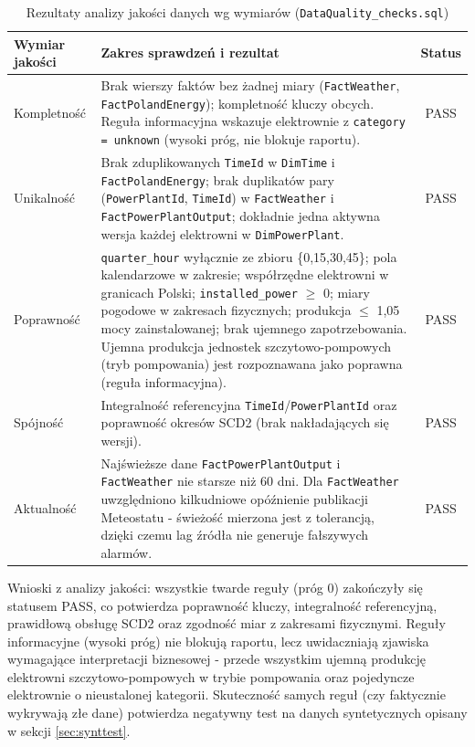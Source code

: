 \documentclass[12pt]{article}
\begin{document}
	\begin{table}[H]
		\centering
		\small
		\begin{tabularx}{\textwidth}{|p{2.6cm}|X|c|}
			\hline
			\textbf{Wymiar jakości} & \textbf{Zakres sprawdzeń i rezultat} & \textbf{Status} \\
			\hline
			Kompletność & Brak wierszy faktów bez żadnej miary (\texttt{FactWeather}, \texttt{FactPolandEnergy}); kompletność kluczy obcych. Reguła informacyjna wskazuje elektrownie z \texttt{category = unknown} (wysoki próg, nie blokuje raportu). & PASS \\
			\hline
			Unikalność & Brak zduplikowanych \texttt{TimeId} w \texttt{DimTime} i \texttt{FactPolandEnergy}; brak duplikatów pary (\texttt{PowerPlantId}, \texttt{TimeId}) w \texttt{FactWeather} i \texttt{FactPowerPlantOutput}; dokładnie jedna aktywna wersja każdej elektrowni w \texttt{DimPowerPlant}. & PASS \\
			\hline
			Poprawność & \texttt{quarter\_hour} wyłącznie ze zbioru \{0,15,30,45\}; pola kalendarzowe w zakresie; współrzędne elektrowni w granicach Polski; \texttt{installed\_power} $\ge$ 0; miary pogodowe w zakresach fizycznych; produkcja $\le$ 1,05 mocy zainstalowanej; brak ujemnego zapotrzebowania. Ujemna produkcja jednostek szczytowo-pompowych (tryb pompowania) jest rozpoznawana jako poprawna (reguła informacyjna). & PASS \\
			\hline
			Spójność & Integralność referencyjna \texttt{TimeId}/\texttt{PowerPlantId} oraz poprawność okresów SCD2 (brak nakładających się wersji). & PASS \\
			\hline
			Aktualność & Najświeższe dane \texttt{FactPowerPlantOutput} i \texttt{FactWeather} nie starsze niż 60 dni. Dla \texttt{FactWeather} uwzględniono kilkudniowe opóźnienie publikacji Meteostatu - świeżość mierzona jest z tolerancją, dzięki czemu lag źródła nie generuje fałszywych alarmów. & PASS \\
			\hline
		\end{tabularx}
		\caption{Rezultaty analizy jakości danych wg wymiarów (\texttt{DataQuality\_checks.sql})}
		\label{tab:dqresults}
	\end{table}

	\noindent Wnioski z analizy jakości: wszystkie twarde reguły (próg 0) zakończyły się statusem PASS, co potwierdza poprawność kluczy, integralność referencyjną, prawidłową obsługę SCD2 oraz zgodność miar z zakresami fizycznymi. Reguły informacyjne (wysoki próg) nie blokują raportu, lecz uwidaczniają zjawiska wymagające interpretacji biznesowej - przede wszystkim ujemną produkcję elektrowni szczytowo-pompowych w trybie pompowania oraz pojedyncze elektrownie o nieustalonej kategorii. Skuteczność samych reguł (czy faktycznie wykrywają złe dane) potwierdza negatywny test na danych syntetycznych opisany w sekcji \ref{sec:synttest}.
\end{document}
